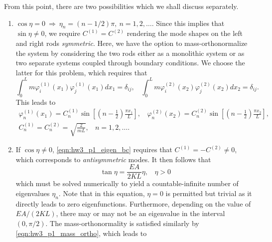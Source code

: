 From this point, there are two possibilities which we shall discuss separately. 
\begin{enumerate}[(1)]
\item {
    $\cos\eta = 0 ~\Rightarrow ~ \eta_n = (n-1/2)\pi, ~n = 1,2,\ldots$. 
    Since this implies that $\sin\eta \neq 0$, we require $C^{(1)} = C^{(2)}$ rendering the mode shapes on the left and right rods \emph{symmetric}. 
    Here, we have the option to mass-orthonormalize the system by considering the two rods either as a monolithic system or as two separate systems coupled through boundary conditions.
    We choose the latter for this problem, which requires that 
    \begin{equation}\label{eqn:hw3_p1_mass_ortho}
        \int_0^L m \varphi_i^{(1)}(x_1) \varphi_j^{(1)}(x_1) dx_1 = \delta_{ij}, ~~~~ 
        \int_0^L m \varphi_i^{(2)}(x_2) \varphi_j^{(2)}(x_2) dx_2 = \delta_{ij}.
    \end{equation}
    This leads to 
    \begin{equation}\label{eqn:hw3_p1_symm}
    \begin{gathered}
        \varphi_n^{(1)}(x_1) = C_n^{(1)} \sin \left[\left(n - \frac{1}{2}\right)\frac{\pi x_1}{L} \right], ~~~~
        \varphi_n^{(2)}(x_2) = C_n^{(2)} \sin \left[\left(n - \frac{1}{2}\right)\frac{\pi x_2}{L} \right], \\
        C_n^{(1)} = C_n^{(2)} = \sqrt{\frac{2}{mL}}, ~~~~ n = 1, 2, \ldots.
    \end{gathered}
    \end{equation}
}
\item {
    If $\cos\eta \neq 0$, \cref{eqn:hw3_p1_eigen_bc} requires that $C^{(1)} = -C^{(2)} \neq 0$, which corresponds to \emph{antisymmetric} modes.
    It then follows that 
    \begin{equation}\label{eqn:hw3_p1_antisymm_eta}
        \tan\eta = \frac{EA}{2KL}\eta, ~~~~ \eta > 0
    \end{equation}
    which must be solved numerically to yield a countable-infinite number of eigenvalues $\eta_n$. 
    Note that in this equation, $\eta = 0$ is permitted but trivial as it directly leads to zero eigenfunctions.  
    Furthermore, depending on the value of $EA / (2KL)$, there may or may not be an eigenvalue in the interval $(0, \pi/2)$.
    The mass-orthonormality is satisfied similarly by \cref{eqn:hw3_p1_mass_ortho}, which leads to
    \begin{equation}\label{eqn:hw3_p1_antisymm}
    \begin{gathered}

\end{gathered}
\end{equation}}
\end{enumerate}
